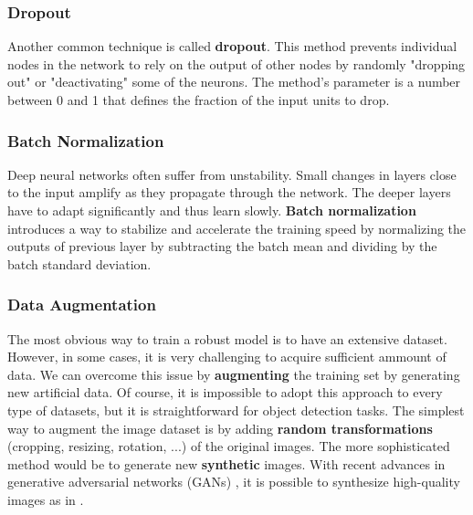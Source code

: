 \subsubsection{Dropout}
Another common technique is called \textbf{dropout}. This method prevents
individual nodes in the network to rely on the output of other nodes by randomly
"dropping out" or "deactivating" some of the neurons. The method's parameter is
a number between 0 and 1 that defines the fraction of the input units to drop.

\subsubsection{Batch Normalization}
Deep neural networks often suffer from unstability. Small changes in layers
close to the input amplify as they propagate through the network. The deeper
layers have to adapt significantly and thus learn slowly.
\textbf{Batch normalization} introduces a way to stabilize and accelerate the
training speed by normalizing the outputs of previous layer by subtracting the
batch mean and dividing by the batch standard deviation.

\subsubsection{Data Augmentation}
The most obvious way to train a robust model is to have an extensive dataset.
However, in some cases, it is very challenging to acquire sufficient ammount of
data. We can overcome this issue by
\textbf{augmenting} the training set by generating new artificial data. Of
course, it is impossible to adopt this approach to every type of datasets, but
it is straightforward for object detection tasks. The simplest way to augment
the image dataset is by adding \textbf{random transformations} (cropping,
resizing, rotation, ...) of the original images. The more sophisticated method
would be to generate new \textbf{synthetic} images. With recent advances in
generative adversarial networks (GANs) \cite{gan}, it is possible to synthesize
high-quality images as in \cite{wei2019generative}.